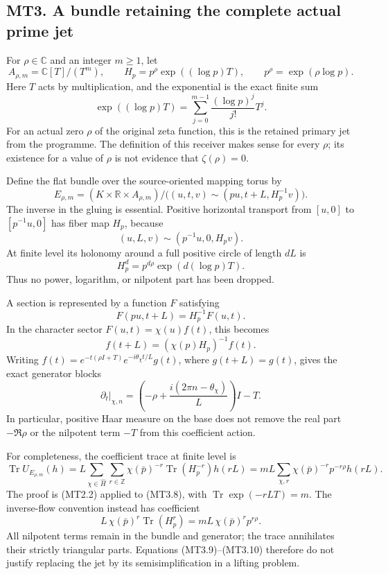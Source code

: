 \subsection{MT3. A bundle retaining the complete actual prime
jet}\label{mt3.-a-bundle-retaining-the-complete-actual-prime-jet}

For \(\rho\in\mathbb C\) and an integer \(m\ge1\), let \[
 A_{\rho,m}=\mathbb C[T]/(T^m),\qquad
 H_p=p^\rho\exp((\log p)T),\qquad
 p^\rho=\exp(\rho\log p).
\tag{MT3.1}
\] Here \(T\) acts by multiplication, and the exponential is the exact
finite sum \[
 \exp((\log p)T)=\sum_{j=0}^{m-1}
       \frac{(\log p)^j}{j!}T^j.
\tag{MT3.2}
\] For an actual zero \(\rho\) of the original zeta function, this is
the retained primary jet from the programme. The definition of this
receiver makes sense for every \(\rho\); its existence for a value of
\(\rho\) is not evidence that \(\zeta(\rho)=0\).

Define the flat bundle over the source-oriented mapping torus by \[
 E_{\rho,m}
 =(K\times\mathbb R\times A_{\rho,m})/
 \bigl((u,t,v)\sim(pu,t+L,H_p^{-1}v)\bigr).
\tag{MT3.3}
\] The inverse in the gluing is essential. Positive horizontal transport
from \([u,0]\) to \([p^{-1}u,0]\) has fiber map \(H_p\), because \[
 (u,L,v)\sim(p^{-1}u,0,H_pv).
\tag{MT3.4}
\] At finite level its holonomy around a full positive circle of length
\(dL\) is \[
 H_p^d=p^{d\rho}\exp(d(\log p)T).
\tag{MT3.5}
\] Thus no power, logarithm, or nilpotent part has been dropped.

A section is represented by a function \(F\) satisfying \[
 F(pu,t+L)=H_p^{-1}F(u,t).
\tag{MT3.6}
\] In the character sector \(F(u,t)=\chi(u)f(t)\), this becomes \[
 f(t+L)=(\chi(p)H_p)^{-1}f(t).
\tag{MT3.7}
\] Writing \(f(t)=e^{-t(\rho I+T)}e^{-i\theta_\chi t/L}g(t)\), where
\(g(t+L)=g(t)\), gives the exact generator blocks \[
 \partial_t\big|_{\chi,n}
   =\left(-\rho+\frac{i(2\pi n-\theta_\chi)}{L}\right)I-T.
\tag{MT3.8}
\] In particular, positive Haar measure on the base does not remove the
real part \(-\Re\rho\) or the nilpotent term \(-T\) from this
coefficient action.

For completeness, the coefficient trace at finite level is \[
 \operatorname{Tr}U_{E_{\rho,m}}(h)
  =L\sum_{\chi\in\widehat H}\sum_{r\in\mathbb Z}
       \chi(\bar p)^{-r}\operatorname{Tr}(H_p^{-r})h(rL)
  =mL\sum_{\chi,r}\chi(\bar p)^{-r}p^{-r\rho}h(rL).
\tag{MT3.9}
\] The proof is (MT2.2) applied to (MT3.8), with
\(\operatorname{Tr}\exp(-rLT)=m\). The inverse-flow convention instead
has coefficient \[
 L\,\chi(\bar p)^r\operatorname{Tr}(H_p^r)
       =mL\,\chi(\bar p)^r p^{r\rho}.
\tag{MT3.10}
\] All nilpotent terms remain in the bundle and generator; the trace
annihilates their strictly triangular parts. Equations (MT3.9)--(MT3.10)
therefore do not justify replacing the jet by its semisimplification in
a lifting problem.

